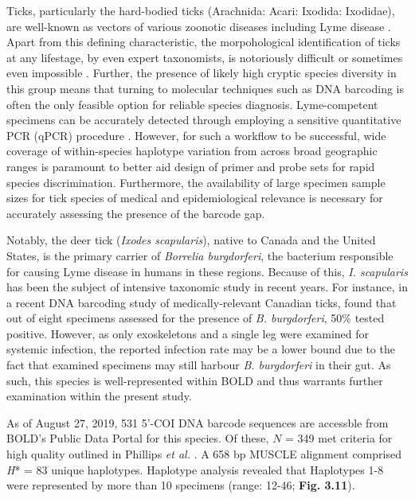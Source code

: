 Ticks, particularly the hard-bodied ticks (Arachnida: Acari: Ixodida: Ixodidae), are well-known as vectors of various zoonotic diseases including Lyme disease \cite{ondrejicka2014status}. Apart from this defining characteristic, the morpohological identification of ticks at any lifestage, by even expert taxonomists, is notoriously difficult or sometimes even impossible \cite{ondrejicka2017dna}. Further, the presence of likely high cryptic species diversity in this group means that turning to molecular techniques such as DNA barcoding is often the only feasible option for reliable species diagnosis. Lyme-competent specimens can be accurately detected through employing a sensitive quantitative PCR (qPCR) procedure \cite{ondrejicka2017dna}. However, for such a workflow to be successful, wide coverage of within-species haplotype variation from across broad geographic ranges is paramount to better aid design of primer and probe sets for rapid species discrimination. Furthermore, the availability of large specimen sample sizes for tick species of medical and epidemiological relevance is necessary for accurately assessing the presence of the barcode gap.

Notably, the deer tick (\textit{Ixodes scapularis}), native to Canada and the United States, is the primary carrier of \textit{Borrelia burgdorferi}, the bacterium responsible for causing Lyme disease in humans in these regions. Because of this, \textit{I. scapularis} has been the subject of intensive taxonomic study in recent years. For instance, in a recent DNA barcoding study of medically-relevant Canadian ticks, \cite{ondrejicka2017dna} found that out of eight specimens assessed for the presence of \textit{B. burgdorferi}, 50\% tested positive. However, as only exoskeletons and a single leg were examined for systemic infection, the reported infection rate may be a lower bound due to the fact that examined specimens may still harbour \textit{B. burgdorferi} in their gut. As such, this species is well-represented within BOLD and thus warrants further examination within the present study.

As of August 27, 2019, 531 5'-COI DNA barcode sequences are accessble from \\ BOLD's Public Data Portal for this species. Of these, $N$ = 349 met criteria for high quality outlined in Phillips \textit{et al.} \cite{phillips2015exploration}. A 658 bp MUSCLE alignment comprised \textit{H}* = 83 unique haplotypes. Haplotype analysis revealed that Haplotypes 1-8 were represented by more than 10 specimens (range: 12-46; \textbf{Fig. 3.11}). 


